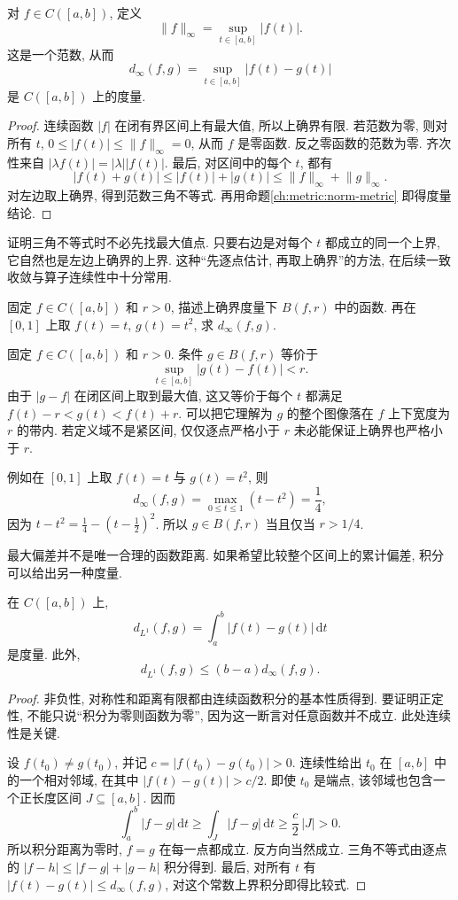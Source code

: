 \begin{proposition}[上确界范数]\label{ch:metric:sup}
对 $f\in C([a,b])$, 定义
\[
 \lVert f\rVert_\infty=\sup_{t\in[a,b]}|f(t)|.
\]
这是一个范数, 从而
\[
 d_\infty(f,g)=\sup_{t\in[a,b]}|f(t)-g(t)|
\]
是 $C([a,b])$ 上的度量.
\end{proposition}
\begin{proof}
连续函数 $|f|$ 在闭有界区间上有最大值, 所以上确界有限. 若范数为零, 则对所有 $t$, $0\le|f(t)|\le\lVert f\rVert_\infty=0$, 从而 $f$ 是零函数. 反之零函数的范数为零. 齐次性来自 $|\lambda f(t)|=|\lambda||f(t)|$. 最后, 对区间中的每个 $t$, 都有
\[
 |f(t)+g(t)|\le|f(t)|+|g(t)|
 \le\lVert f\rVert_\infty+\lVert g\rVert_\infty.
\]
对左边取上确界, 得到范数三角不等式. 再用命题\ref{ch:metric:norm-metric} 即得度量结论.
\end{proof}
证明三角不等式时不必先找最大值点. 只要右边是对每个 $t$ 都成立的同一个上界, 它自然也是左边上确界的上界. 这种``先逐点估计, 再取上确界''的方法, 在后续一致收敛与算子连续性中十分常用.

\begin{example}
固定 $f\in C([a,b])$ 和 $r>0$, 描述上确界度量下 $B(f,r)$ 中的函数. 再在 $[0,1]$ 上取 $f(t)=t$, $g(t)=t^2$, 求 $d_\infty(f,g)$.
\end{example}
\begin{solution}
固定 $f\in C([a,b])$ 和 $r>0$. 条件 $g\in B(f,r)$ 等价于
\[
 \sup_{t\in[a,b]}|g(t)-f(t)|<r.
\]
由于 $|g-f|$ 在闭区间上取到最大值, 这又等价于每个 $t$ 都满足 $f(t)-r<g(t)<f(t)+r$. 可以把它理解为 $g$ 的整个图像落在 $f$ 上下宽度为 $r$ 的带内. 若定义域不是紧区间, 仅仅逐点严格小于 $r$ 未必能保证上确界也严格小于 $r$.

例如在 $[0,1]$ 上取 $f(t)=t$ 与 $g(t)=t^2$, 则
\[
 d_\infty(f,g)=\max_{0\le t\le1}(t-t^2)=\frac14,
\]
因为 $t-t^2=\frac14-(t-\frac12)^2$. 所以 $g\in B(f,r)$ 当且仅当 $r>1/4$.
\end{solution}

最大偏差并不是唯一合理的函数距离. 如果希望比较整个区间上的累计偏差, 积分可以给出另一种度量.

\begin{proposition}[积分距离]\label{ch:metric:l1}
在 $C([a,b])$ 上,
\[
 d_{L^1}(f,g)=\int_a^b|f(t)-g(t)|\,\mathrm{d}t
\]
是度量. 此外,
\[
 d_{L^1}(f,g)\le(b-a)d_\infty(f,g).
\]
\end{proposition}
\begin{proof}
非负性, 对称性和距离有限都由连续函数积分的基本性质得到. 要证明正定性, 不能只说``积分为零则函数为零'', 因为这一断言对任意函数并不成立. 此处连续性是关键.

设 $f(t_0)\ne g(t_0)$, 并记 $c=|f(t_0)-g(t_0)|>0$. 连续性给出 $t_0$ 在 $[a,b]$ 中的一个相对邻域, 在其中 $|f(t)-g(t)|>c/2$. 即使 $t_0$ 是端点, 该邻域也包含一个正长度区间 $J\subseteq[a,b]$. 因而
\[
 \int_a^b|f-g|\,\mathrm{d}t
 \ge\int_J|f-g|\,\mathrm{d}t
 \ge\frac c2\,|J|>0.
\]
所以积分距离为零时, $f=g$ 在每一点都成立. 反方向当然成立. 三角不等式由逐点的 $|f-h|\le|f-g|+|g-h|$ 积分得到. 最后, 对所有 $t$ 有 $|f(t)-g(t)|\le d_\infty(f,g)$, 对这个常数上界积分即得比较式.
\end{proof}

